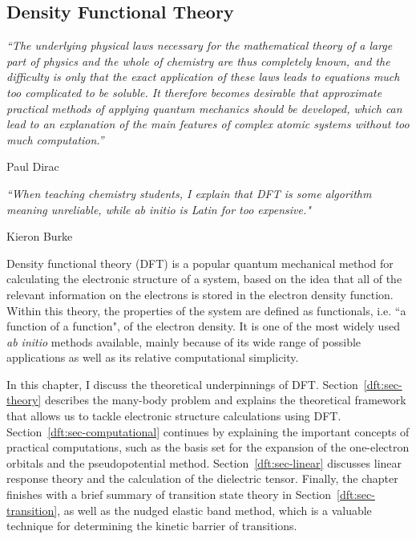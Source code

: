 \begin{refsection} 

\chapter{Density Functional Theory} \label{chapter:dft}
\pagestyle{chapter}

\setlength{\epigraphwidth}{4in} 
\epigraph{\textit{``The underlying physical laws necessary for the 
mathematical theory of a large part of physics and the whole of chemistry are 
thus completely known, and the difficulty is only that the exact application 
of these laws leads to equations much too complicated to be soluble. It 
therefore becomes desirable that approximate practical methods of applying 
quantum mechanics should be developed, which can lead to an explanation of the 
main features of complex atomic systems without too much computation.''}}{Paul 
Dirac} 
\vspace{2em} 
 
\setlength{\epigraphwidth}{4in} 
\epigraph{\textit{``When teaching chemistry students, I explain that \gls{DFT} is 
some algorithm meaning unreliable, while ab initio is Latin for too 
expensive."}}{Kieron Burke} 
\vspace{3em} 
 
Density functional theory (\gls{DFT}) is a popular quantum mechanical 
method for calculating the electronic structure of a system, based on the idea 
that all of the relevant information on the electrons is stored in the 
electron density function. Within this theory, the properties of the system 
are defined as functionals, i.e. ``a function of a function", of the electron 
density. It is one of the most widely used \textit{ab initio} methods 
available, mainly because of its wide range of possible applications as well 
as its relative computational simplicity.  
 
In this chapter, I discuss the theoretical underpinnings of \gls{DFT}. 
Section~\ref{dft:sec-theory} describes the many-body problem and explains the 
theoretical framework that allows us to tackle electronic structure 
calculations using \gls{DFT}. Section~\ref{dft:sec-computational} continues by 
explaining the important concepts of practical computations, such as the basis
set for the expansion of the one-electron orbitals and the pseudopotential method. 
Section~\ref{dft:sec-linear} discusses 
linear response theory and the calculation of the dielectric tensor. Finally, 
the chapter finishes with a brief summary of transition state theory in 
Section~\ref{dft:sec-transition}, as well as the nudged elastic band method, 
which is a valuable technique for determining the kinetic barrier of 
transitions.  
 

\end{refsection}
